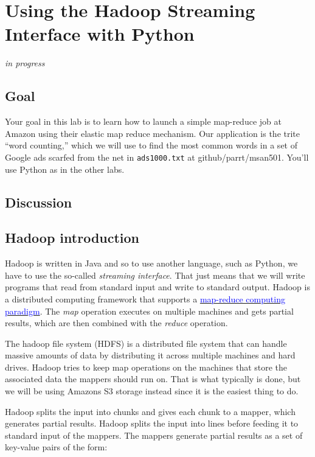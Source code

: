 \chapter{Using the Hadoop Streaming Interface with Python}

\setcounter{problem}{1}

\begin{fullwidth}
{\em in progress}

\section{Goal}

Your goal in this lab is to learn how to launch a simple map-reduce job at Amazon using their elastic map reduce mechanism. Our application is the trite ``word counting,'' which we will use to find the most common words in a set of Google ads scarfed from the net in {\tt ads1000.txt} at github/parrt/msan501. You'll use Python as in the other labs.

\section{Discussion}

\section{Hadoop introduction}

Hadoop is written in Java and so to use another language, such as Python, we have to use the so-called {\em streaming interface}. That just means that we will write programs that read from standard input and write to standard output. Hadoop is a distributed computing framework that supports a \href{http://wiki.apache.org/hadoop/HadoopMapReduce}{\textcolor{blue}{map-reduce computing paradigm}}. The {\em map} operation executes on multiple machines and gets partial results, which are then combined with the {\em reduce} operation. 

The hadoop file system (HDFS) is a distributed file system that can handle massive amounts of data by distributing it across multiple machines and hard drives. Hadoop tries to keep map operations on the machines that store the associated data the mappers should run on. That is what typically is done, but we will be using Amazons S3 storage instead since it is the easiest thing to do.

Hadoop splits the input into chunks and gives each  chunk to a mapper, which generates partial results. Hadoop splits the input into lines before feeding it to standard input of the mappers. The mappers generate partial results as a set of key-value pairs of the form:


\end{fullwidth}
